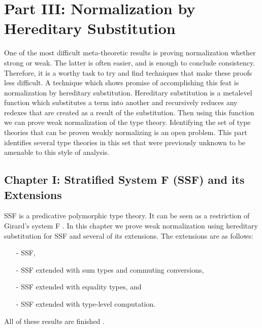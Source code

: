 \section{Part III: Normalization by Hereditary Substitution}
\label{sec:normalization_by_hereditary_substitution}
One of the most difficult meta-theoretic results is proving
normalization whether strong or weak.  The latter is often easier, and
is enough to conclude consistency.  Therefore, it is a worthy task to
try and find techniques that make these proofs less difficult.  A
technique which shows promise of accomplishing this feat is
normalization by hereditary substitution.  Hereditary substitution is
a metalevel function which substitutes a term into another and
recursively reduces any redexes that are created as a result of the
substitution.  Then using this function we can prove weak
normalization of the type theory.  Identifying the set of type
theories that can be proven weakly normalizing is an open problem.
This part identifies several type theories in this set that were
previously unknown to be amenable to this style of analysis.

\subsection{Chapter I: Stratified System F (SSF) and its Extensions}
\label{subsec:stratified_system_f_ext}
SSF is a predicative polymorphic type theory.  It can be seen as a
restriction of Girard's system F \cite{Leivant:1991}. In this chapter
we prove weak normalization using hereditary substitution for SSF and
several of its extensions. The extensions are as follows:
\begin{itemize}
\item[-] SSF,
\item[-] SSF extended with sum types and commuting conversions,
\item[-] SSF extended with equality types, and
\item[-] SSF extended with type-level computation.
\end{itemize}
\noindent
All of these results are finished \cite{Eades:2011,Eades:2010}.

